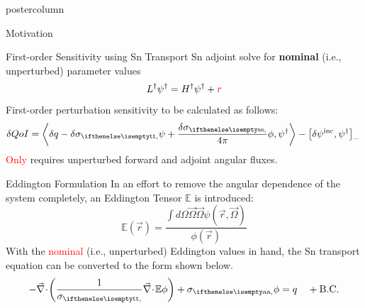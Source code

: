 \documentclass[xcolor={usenames,dvipsnames,svgnames,table}]{beamer}
\newcommand{\vr}{\vec{r}}
\newcommand{\vO}{\vec{\Omega}}
\newcommand{\bra}{\left\langle}
\newcommand{\ket}{\right\rangle}
\newcommand{\sbra}{\left[}
\newcommand{\sket}{\right]}
\newcommand{\bound}{\partial V}
\newcommand{\vn}{\vec{n}}
\newcommand{\Edd}{\mathbb{E}}
\newcommand{\BEdd}{B}
\newcommand{\scalSource}{q}
\newcommand{\angResp}{q^\dag}
\newcommand{\tcr}[1]{\textcolor{red}{#1}}
\begin{document}
\begin{frame}
\begin{columns}
\begin{column}{.33\textwidth}
\begin{beamercolorbox}[center,wd=\textwidth]{postercolumn}
\begin{minipage}[T]{0.95\textwidth}
{\begin{block}{Motivation}
			    \end{block}
			    \vfill


			    \begin{block}{First-order Sensitivity using Sn Transport}
Sn adjoint solve for {\bf nominal} (i.e., unperturbed) parameter values 			    
\begin{equation}
\label{snAdj}
L^\dag \psi^\dag = H^\dag \psi^\dag + \tcr{r}
\end{equation}
First-order perturbation sensitivity to be calculated as follows:
\begin{equation}
\label{snSens}
\delta QoI = \bra \delta \scalSource - \delta \sigt \psi + \frac{\delta\sigs}{4 \pi} \phi , \psi^\dag  \ket - \sbra \delta \psi^{\text{inc}}, \psi^\dag \sket_- \,
\end{equation}
\tcr{Only} requires unperturbed forward and adjoint angular fluxes.
			    \end{block}
			    \vfill




\begin{block}{Eddington Formulation}
In an effort to remove the angular dependence of the system completely, an Eddington Tensor $\Edd$ is introduced:
\begin{equation}
\label{EddDef}
\Edd(\vr)=\frac{\int d\Omega \vO \vO \psi(\vr,\vO)}{\phi(\vr)}
\end{equation}
With the \tcr{nominal} (i.e., unperturbed) Eddington values in hand, the Sn transport equation can be converted to the form shown below. 
\begin{equation}
\label{VEFForm}
- \div \left( \frac{1}{\sigt}\div \Edd \phi \right) + \siga \phi = \scalSource \quad + \text{B.C.}
\end{equation}


\end{block}}
\end{minipage}
\end{beamercolorbox}
\end{column}
\end{columns}
\end{frame}
\end{document}
